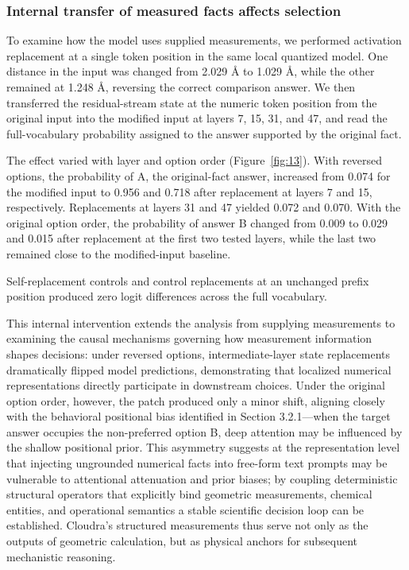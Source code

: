 \subsubsection{Internal transfer of measured facts affects selection}

To examine how the model uses supplied measurements, we performed activation replacement at a single token position in the same local quantized model.\citep{ref16} One distance in the input was changed from 2.029 Å to 1.029 Å, while the other remained at 1.248 Å, reversing the correct comparison answer. We then transferred the residual-stream state at the numeric token position from the original input into the modified input at layers 7, 15, 31, and 47, and read the full-vocabulary probability assigned to the answer supported by the original fact.

The effect varied with layer and option order (Figure~\ref{fig:13}). With reversed options, the probability of A, the original-fact answer, increased from 0.074 for the modified input to 0.956 and 0.718 after replacement at layers 7 and 15, respectively. Replacements at layers 31 and 47 yielded 0.072 and 0.070. With the original option order, the probability of answer B changed from 0.009 to 0.029 and 0.015 after replacement at the first two tested layers, while the last two remained close to the modified-input baseline.

Self-replacement controls and control replacements at an unchanged prefix position produced zero logit differences across the full vocabulary.

This internal intervention extends the analysis from supplying measurements to examining the causal mechanisms governing how measurement information shapes decisions: under reversed options, intermediate-layer state replacements dramatically flipped model predictions, demonstrating that localized numerical representations directly participate in downstream choices. Under the original option order, however, the patch produced only a minor shift, aligning closely with the behavioral positional bias identified in Section 3.2.1—when the target answer occupies the non-preferred option B, deep attention may be influenced by the shallow positional prior. This asymmetry suggests at the representation level that injecting ungrounded numerical facts into free-form text prompts may be vulnerable to attentional attenuation and prior biases; by coupling deterministic structural operators that explicitly bind geometric measurements, chemical entities, and operational semantics a stable scientific decision loop can be established. Cloudra's structured measurements thus serve not only as the outputs of geometric calculation, but as physical anchors for subsequent mechanistic reasoning.



